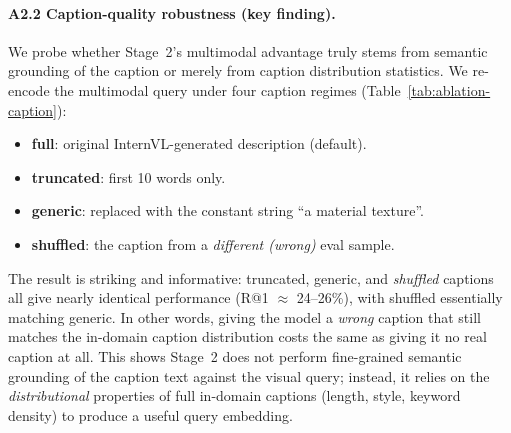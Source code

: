\documentclass[10pt,twocolumn]{article}
\begin{document}
\paragraph{A2.2 Caption-quality robustness (key finding).}
We probe whether Stage~2's multimodal advantage truly stems from semantic
grounding of the caption or merely from caption distribution statistics.
We re-encode the multimodal query under four caption regimes
(Table~\ref{tab:ablation-caption}):
\begin{itemize}[leftmargin=*,itemsep=0pt]
  \item \textbf{full}: original InternVL-generated description (default).
  \item \textbf{truncated}: first 10 words only.
  \item \textbf{generic}: replaced with the constant string ``a material
        texture''.
  \item \textbf{shuffled}: the caption from a \emph{different (wrong)} eval
        sample.
\end{itemize}

\begin{table}[h]
\centering
\caption{Stage~2 multimodal retrieval under different caption regimes.
         Shuffled = wrong (but in-distribution) caption assigned to each query.}
\label{tab:ablation-caption}
\end{table}

The result is striking and informative:
truncated, generic, and \emph{shuffled} captions all give nearly identical
performance (R@1 $\approx$ 24--26\%), with shuffled essentially matching
generic.
In other words, giving the model a \emph{wrong} caption that still matches
the in-domain caption distribution costs the same as giving it no real
caption at all.
This shows Stage~2 does not perform fine-grained semantic grounding of
the caption text against the visual query; instead, it relies on the
\emph{distributional} properties of full in-domain captions (length, style,
keyword density) to produce a useful query embedding.
\end{document}
